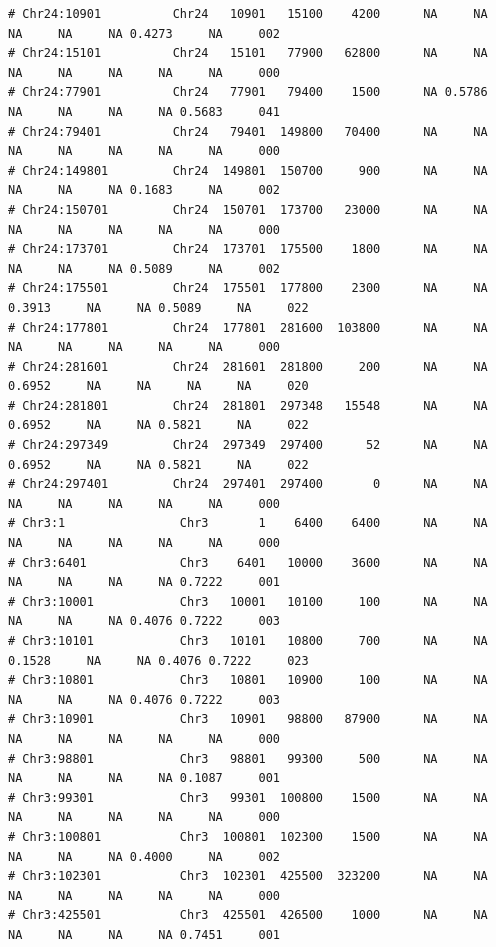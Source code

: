 \documentclass{article}\usepackage[]{graphicx}\usepackage[]{color}
\makeatletter
\newenvironment{kframe}{%
 \def\at@end@of@kframe{}%
 \ifinner\ifhmode%
  \def\at@end@of@kframe{\end{minipage}}%
  \begin{minipage}{\columnwidth}%
 \fi\fi%
 \def\FrameCommand##1{\hskip\@totalleftmargin \hskip-\fboxsep
 \colorbox{shadecolor}{##1}\hskip-\fboxsep
     \hskip-\linewidth \hskip-\@totalleftmargin \hskip\columnwidth}%
 \MakeFramed {\advance\hsize-\width
   \@totalleftmargin\z@ \linewidth\hsize
   \@setminipage}}%
 {\par\unskip\endMakeFramed%
 \at@end@of@kframe}
\newenvironment{knitrout}{}{} %
\makeatother
\begin{document}
\begin{knitrout}
\begin{kframe}
\begin{verbatim}
# Chr24:10901          Chr24   10901   15100    4200      NA     NA     NA     NA     NA 0.4273     NA     002
# Chr24:15101          Chr24   15101   77900   62800      NA     NA     NA     NA     NA     NA     NA     000
# Chr24:77901          Chr24   77901   79400    1500      NA 0.5786     NA     NA     NA     NA 0.5683     041
# Chr24:79401          Chr24   79401  149800   70400      NA     NA     NA     NA     NA     NA     NA     000
# Chr24:149801         Chr24  149801  150700     900      NA     NA     NA     NA     NA 0.1683     NA     002
# Chr24:150701         Chr24  150701  173700   23000      NA     NA     NA     NA     NA     NA     NA     000
# Chr24:173701         Chr24  173701  175500    1800      NA     NA     NA     NA     NA 0.5089     NA     002
# Chr24:175501         Chr24  175501  177800    2300      NA     NA 0.3913     NA     NA 0.5089     NA     022
# Chr24:177801         Chr24  177801  281600  103800      NA     NA     NA     NA     NA     NA     NA     000
# Chr24:281601         Chr24  281601  281800     200      NA     NA 0.6952     NA     NA     NA     NA     020
# Chr24:281801         Chr24  281801  297348   15548      NA     NA 0.6952     NA     NA 0.5821     NA     022
# Chr24:297349         Chr24  297349  297400      52      NA     NA 0.6952     NA     NA 0.5821     NA     022
# Chr24:297401         Chr24  297401  297400       0      NA     NA     NA     NA     NA     NA     NA     000
# Chr3:1                Chr3       1    6400    6400      NA     NA     NA     NA     NA     NA     NA     000
# Chr3:6401             Chr3    6401   10000    3600      NA     NA     NA     NA     NA     NA 0.7222     001
# Chr3:10001            Chr3   10001   10100     100      NA     NA     NA     NA     NA 0.4076 0.7222     003
# Chr3:10101            Chr3   10101   10800     700      NA     NA 0.1528     NA     NA 0.4076 0.7222     023
# Chr3:10801            Chr3   10801   10900     100      NA     NA     NA     NA     NA 0.4076 0.7222     003
# Chr3:10901            Chr3   10901   98800   87900      NA     NA     NA     NA     NA     NA     NA     000
# Chr3:98801            Chr3   98801   99300     500      NA     NA     NA     NA     NA     NA 0.1087     001
# Chr3:99301            Chr3   99301  100800    1500      NA     NA     NA     NA     NA     NA     NA     000
# Chr3:100801           Chr3  100801  102300    1500      NA     NA     NA     NA     NA 0.4000     NA     002
# Chr3:102301           Chr3  102301  425500  323200      NA     NA     NA     NA     NA     NA     NA     000
# Chr3:425501           Chr3  425501  426500    1000      NA     NA     NA     NA     NA     NA 0.7451     001

\end{verbatim}
\end{kframe}
\end{knitrout}
\end{document}
